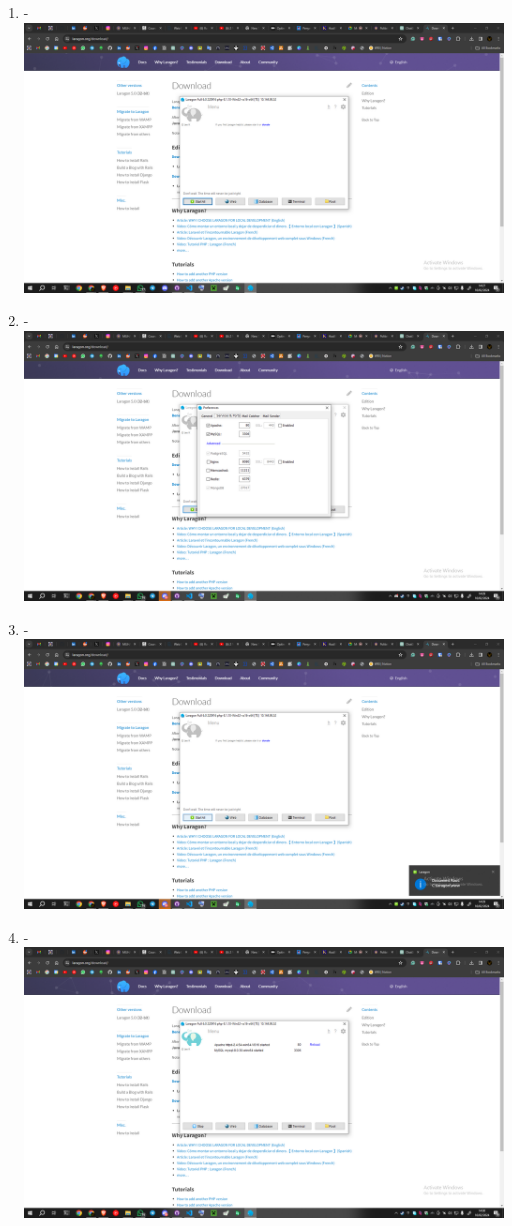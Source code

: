 \documentclass[12pt,titlepage]{article}
\begin{document}
\begin{enumerate}[label= \alph*.]
    \newpage
    \item - \\ \includegraphics[width=.9\textwidth]{images/figures/Laragon 9.png}
    \item - \\ \includegraphics[width=.9\textwidth]{images/figures/Laragon 10.png}
    \newpage
    \item - \\ \includegraphics[width=.9\textwidth]{images/figures/Laragon 11.png}
    \item - \\ \includegraphics[width=.9\textwidth]{images/figures/Laragon 12.png}

\end{enumerate}
\end{document}
